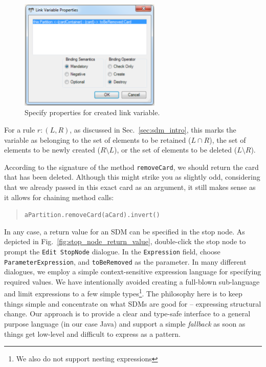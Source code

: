 \begin{figure}[htp] 
\begin{center} 
 \includegraphics[width=0.6\textwidth]{pics/sdmBilder/removeCard/sdm12RAW}
  \caption{Specify properties for created link variable.}  
  \label{fig:link_variable_properties}
\end{center}
\end{figure}



For a rule $r: (L, R)$, as discussed in Sec.~\ref{sec:sdm_intro}, this marks the variable as belonging to the set of elements to be retained ($L\cap R$), the set of elements to be newly created ($R\setminus L$), or the set of elements to be deleted ($L\setminus R$).
 
According to the signature of the method \texttt{removeCard}, we should return the card that has been deleted.  
Although this might strike you as slightly odd, considering that we already passed in this exact card as an argument, it still makes sense as it allows for chaining method calls: \begin{quote}\texttt{aPartition.removeCard(aCard).invert()}\end{quote}
In any case, a return value for an SDM can be specified in the stop node.
As depicted in Fig.~\ref{fig:stop_node_return_value}, double-click the stop node to prompt the \texttt{Edit StopNode} dialogue.
In the \texttt{Expression} field, choose \texttt{ParameterExpression}, and \texttt{toBeRemoved} as the parameter.  
In many different dialogues, we employ a simple context-sensitive expression language for specifying required values.  
We have intentionally avoided creating a full-blown sub-language and limit expressions to a few simple types\footnote{We also do not support nesting expressions}.  
The philosophy here is to keep things simple and concentrate on what SDMs are good for -- expressing structural change.  
Our approach is to provide a clear and type-safe interface to a general purpose language (in our case Java) and support a simple \emph{fallback} as soon as things get low-level and difficult to express as a pattern.  

